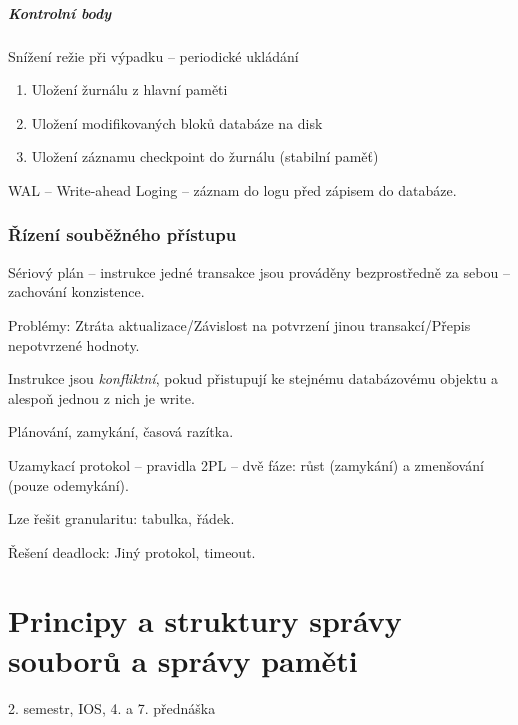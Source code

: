 \documentclass[a4paper, 11pt]{report}
\begin{document}
\paragraph{Kontrolní body}
Snížení režie při výpadku -- periodické ukládání
\begin{enumerate}
	\item Uložení žurnálu z hlavní paměti
	\item Uložení modifikovaných bloků databáze na disk
	\item Uložení záznamu checkpoint do žurnálu (stabilní paměť)
\end{enumerate}

WAL -- Write-ahead Loging -- záznam do logu před zápisem do databáze.

\subsection{Řízení souběžného přístupu}
Sériový plán -- instrukce jedné transakce jsou prováděny bezprostředně za sebou -- zachování konzistence.

Problémy: Ztráta aktualizace/Závislost na potvrzení jinou transakcí/Přepis nepotvrzené hodnoty.

Instrukce jsou \emph{konfliktní}, pokud přistupují ke stejnému databázovému objektu a alespoň jednou z nich je write.

Plánování, zamykání, časová razítka.

Uzamykací protokol -- pravidla 2PL -- dvě fáze: růst (zamykání) a zmenšování (pouze odemykání).

Lze řešit granularitu: tabulka, řádek.

Řešení deadlock: Jiný protokol, timeout.


















\chapter{Principy a struktury správy souborů a správy paměti} \label{cha:34}

2. semestr, IOS, 4. a 7. přednáška
\end{document}

